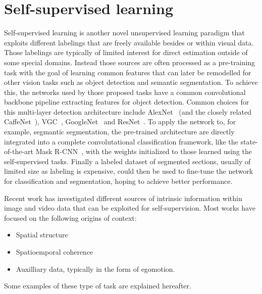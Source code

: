 \section{Self-supervised learning}
Self-supervised learning is another novel unsupervised learning paradigm that exploits different labelings that are freely available besides or within visual data. Those labelings are typically of limited interest for direct estimation outside of some special domains. Instead those sources are often processed as a pre-training task with the goal of learning common features that can later be remodelled for other vision tasks such as object detection and semantic segmentation\cite{misra2016}. To achieve this, the networks used by those proposed tasks have a common convolutional backbone pipeline extracting features for object detection. Common choices for this multi-layer detection architecture include AlexNet~\cite{krizhevsky2012} (and the closely related CaffeNet~\cite{jia2014}), VGC~\cite{simonyan2014}, GoogleNet~\cite{szegedy2015} and ResNet~\cite{he2016}. To apply the network to, for example, segmantic segmentation, the pre-trained architecture are directly integrated into a complete convolutational classification framework, like the state-of-the-art Mask R-CNN~\cite{he2017}, with the weights initialized to those learned using the self-supervised tasks. Finally a labeled dataset of segmented sections, usually of limited size as labeling is expensive, could then be used to fine-tune the network for classification and segmentation, hoping to achieve better performance.

Recent work has investigated different sources of intrinsic information within image and video data that can be exploited for self-supervision. Most works have focused on the following origins of context: 
\begin{itemize}
\item Spatial structure
\item Spatioemporal coherence 
\item Auxilliary data, typically in the form of egomotion.
\end{itemize}
Some examples of these type of task are explained hereafter.


